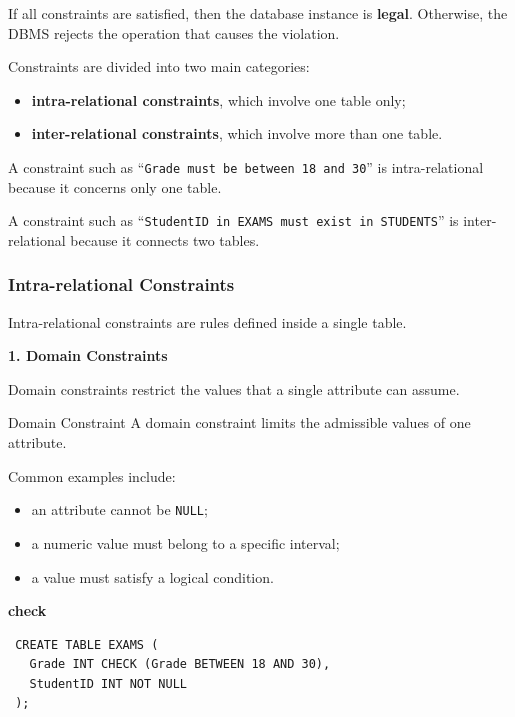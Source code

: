  If all constraints are satisfied, then the database instance is \textbf{legal}. Otherwise, the DBMS rejects the operation that causes the violation.

 Constraints are divided into two main categories:
 \begin{itemize}
  \item \textbf{intra-relational constraints}, which involve one table only;
  \item \textbf{inter-relational constraints}, which involve more than one table.
 \end{itemize}

 \vs
 \begin{example}
  A constraint such as ``\texttt{Grade must be between 18 and 30}'' is intra-relational because it concerns only one table.

  A constraint such as ``\texttt{StudentID in EXAMS must exist in STUDENTS}'' is inter-relational because it connects two tables.
 \end{example}

 \subsubsection{Intra-relational Constraints}

 Intra-relational constraints are rules defined inside a single table.

 \vspace{0.3cm}
 \textbf{1. Domain Constraints}

 Domain constraints restrict the values that a single attribute can assume.

 \begin{defbox}{Domain Constraint}
  A domain constraint limits the admissible values of one attribute.
 \end{defbox}

 Common examples include:
 \begin{itemize}
  \item an attribute cannot be \texttt{NULL};
  \item a numeric value must belong to a specific interval;
  \item a value must satisfy a logical condition.
 \end{itemize}

\pagebreak

\begin{example}{\textbf{check}}

 \begin{verbatim}
 CREATE TABLE EXAMS (
   Grade INT CHECK (Grade BETWEEN 18 AND 30),
   StudentID INT NOT NULL
 );
 \end{verbatim}

\end{example}

